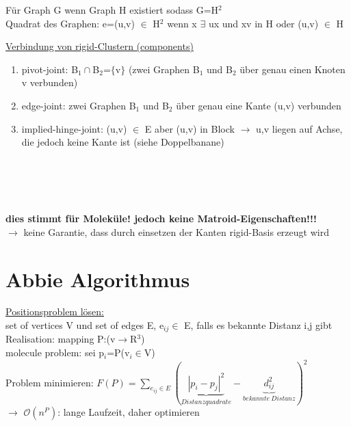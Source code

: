 \documentclass[12pt,a4paper]{article}
\begin{document}
Für Graph G wenn Graph H existiert sodass G=H$^2$\\
Quadrat des Graphen: e=(u,v) $\in$ H$^2$ wenn x $\exists$ ux und xv in H oder (u,v) $\in$ H

\underline{Verbindung von rigid-Clustern (components)}
\begin{enumerate}
	\item pivot-joint: B$_1\cap$B$_2$=$\{$v$\}$ (zwei Graphen B$_1$ und B$_2$ über genau einen Knoten v verbunden)
	\item edge-joint: zwei Graphen B$_1$ und B$_2$ über genau eine Kante (u,v) verbunden
	\item implied-hinge-joint: (u,v) $\in$ E aber (u,v) in Block $\rightarrow$ u,v liegen auf Achse, die jedoch keine Kante ist (siehe Doppelbanane)
\end{enumerate}

\\\\
\\\\
\textbf{dies stimmt für Moleküle! jedoch keine Matroid-Eigenschaften!!!}\\
$\rightarrow$ keine Garantie, dass durch einsetzen der Kanten rigid-Basis erzeugt wird
\newpage
\section{Abbie Algorithmus}

\underline{Positionsproblem lösen:}\\
set of vertices V und set of edges E, e$_{ij} \in$ E, falls es bekannte Distanz i,j gibt\\
Realisation: mapping P:(v$\rightarrow$R$^3$)\\
molecule problem: sei p$_i$=P(v$_i \in$V)\\
Problem minimieren: $F(P)=\sum \limits_{e_{ij} \in E} (\underbrace{|p_i-p_j|^2}_{Distanzquadrate}-\underbrace{d_{ij}^2}_{bekannte\ Distanz})^2$\\
$\rightarrow$ $\mathcal{O}(n^P)$: lange Laufzeit, daher optimieren
\end{document}
